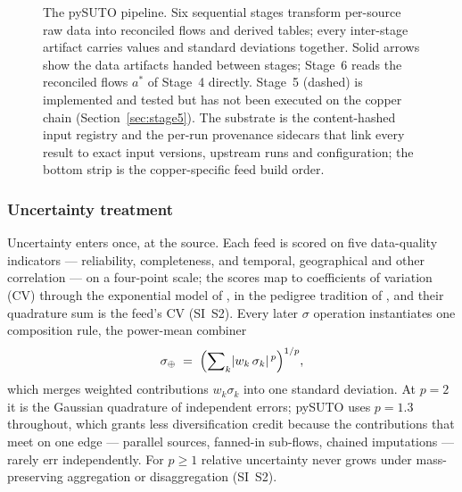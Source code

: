 \begin{figure}[t]
{}
\caption{The pySUTO pipeline. Six sequential stages transform per-source raw
data into reconciled flows and derived tables; every inter-stage artifact
carries values and standard deviations together. Solid arrows show the data
artifacts handed between stages; Stage~6 reads the reconciled flows $a^*$ of
Stage~4 directly. Stage~5 (dashed) is implemented and tested but has not
been executed on the copper chain (Section~\ref{sec:stage5}). The substrate
is the content-hashed input registry and the per-run provenance sidecars
that link every result to exact input versions, upstream runs and
configuration; the bottom strip is the copper-specific feed build order.}
\label{fig:pipeline}
\end{figure}

\subsubsection{Uncertainty treatment}\label{sec:uncertainty}

Uncertainty enters once, at the source. Each feed is scored on five
data-quality indicators --- reliability, completeness, and temporal,
geographical and other correlation --- on a four-point scale; the scores map
to coefficients of variation (CV) through the exponential model of
\citet{laner2016}, in the pedigree tradition of \citet{weidema1996pedigree},
and their quadrature sum is the feed's CV (SI~S2). Every later $\sigma$
operation instantiates one composition rule, the power-mean combiner
\begin{equation}
\sigma_{\oplus} \;=\; \Bigl(\sum\nolimits_k \lvert w_k\,
\sigma_k\rvert^{\,p}\Bigr)^{1/p},
\label{eq:lp}
\end{equation}
which merges weighted contributions $w_k \sigma_k$ into one standard
deviation. At $p=2$ it is the Gaussian quadrature of independent errors;
pySUTO uses $p=1.3$ throughout, which grants less diversification credit
because the contributions that meet on one edge --- parallel sources,
fanned-in sub-flows, chained imputations --- rarely err independently. For
$p \ge 1$ relative uncertainty never grows under mass-preserving aggregation
or disaggregation (SI~S2).

